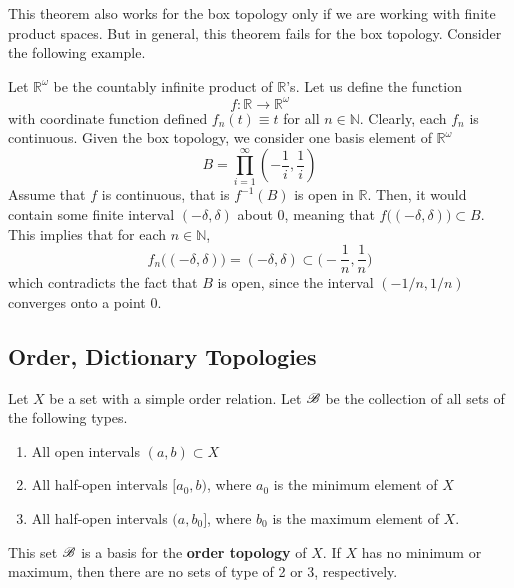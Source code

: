     This theorem also works for the box topology only if we are working with finite product spaces. But in general, this theorem fails for the box topology. Consider the following example. 

    \begin{example}
      Let $\mathbb{R}^\omega$ be the countably infinite product of $\mathbb{R}$'s. Let us define the function 
      \begin{equation}
        f: \mathbb{R} \rightarrow \mathbb{R}^\omega
      \end{equation}
      with coordinate function defined $f_n (t) \equiv t$ for all $n \in \mathbb{N}$. Clearly, each $f_n$ is continuous. Given the box topology, we consider one basis element of $\mathbb{R}^\omega$
      \begin{equation}
        B = \prod_{i=1}^\infty (-\frac{1}{i}, \frac{1}{i})
      \end{equation}
      Assume that $f$ is continuous, that is $f^{-1}(B)$ is open in $\mathbb{R}$. Then, it would contain some finite interval $(-\delta, \delta)$ about $0$, meaning that $f\big( (-\delta, \delta)\big) \subset B$. This implies that for each $n \in \mathbb{N}$, 
      \begin{equation}
        f_n \big( (-\delta, \delta) \big) = (-\delta, \delta) \subset \Big( -\frac{1}{n}, \frac{1}{n} \Big)
      \end{equation}
      which contradicts the fact that $B$ is open, since the interval $(-1/n, 1/n)$ converges onto a point $0$. 
    \end{example}

  \subsection{Order, Dictionary Topologies} 

    \begin{definition}
      Let $X$ be a set with a simple order relation. Let $\B$ be the collection of all sets of the following types. 
      \begin{enumerate}
        \item All open intervals $(a, b) \subset X$
        \item All half-open intervals $[a_0, b)$, where $a_0$ is the minimum element of $X$
        \item All half-open intervals $(a, b_0]$, where $b_0$ is the maximum element of $X$. 
      \end{enumerate}
      This set $\B$ is a basis for the \textbf{order topology} of $X$. If $X$ has no minimum or maximum, then there are no sets of type of 2 or 3, respectively. 
    \end{definition}

